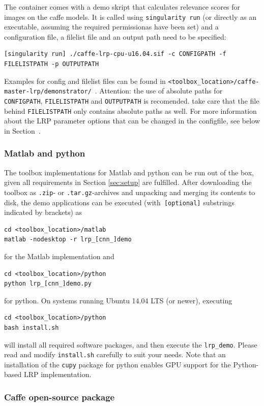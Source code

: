 \documentclass[a4wide]{article}
\begin{document}
The container comes with a demo skript that calculates relevance scores for images on the caffe models.
It is called using \verb!singularity run! (or directly as an executable, assuming the required permissionas have been set) and a configuration file, a filelist file and an output path need to be specified:
\begin{Verbatim}[frame = single]
[singularity run] ./caffe-lrp-cpu-u16.04.sif -c CONFIGPATH -f FILELISTPATH -p OUTPUTPATH
\end{Verbatim}
Examples for config and filelist files can be found in \verb!<toolbox_location>/caffe-master-lrp/demonstrator/!~.
Attention: the use of absolute paths for \verb!CONFIGPATH!, \verb!FILELISTPATH! and \verb!OUTPUTPATH!  is recomended.
take care that the file behind \verb!FILELISTPATH! only contains absolute paths as well.
For more information about the LRP parameter options that can be changed in the configfile, see below in Section~.

\subsubsection*{Matlab and python}
The toolbox implementations for Matlab and python can be run out of the box, given all requirements in Section \ref{sec:setup} are fulfilled. After downloading the toolbox as \texttt{.zip}- or \texttt{.tar.gz}-archives and unpacking and merging its contents to disk, the demo applications can be executed (with\verb| [optional]| substrings indicated by brackets) as
\begin{Verbatim}[frame = single]
cd <toolbox_location>/matlab
matlab -nodesktop -r lrp_[cnn_]demo
\end{Verbatim}
for the Matlab implementation and
\begin{Verbatim}[frame = single]
cd <toolbox_location>/python
python lrp_[cnn_]demo.py
\end{Verbatim}
for python. On systems running Ubuntu 14.04 LTS (or newer), executing
\begin{Verbatim}[frame = single]
cd <toolbox_location>/python
bash install.sh
\end{Verbatim}
will install all required software packages, and then execute the \texttt{lrp\_demo}. Please read and modify \texttt{install.sh} carefully to suit your needs.
Note that an installation of the \texttt{cupy} package for python enables GPU support for the Python-based LRP implementation.

\subsubsection*{Caffe open-source package}
\end{document}

